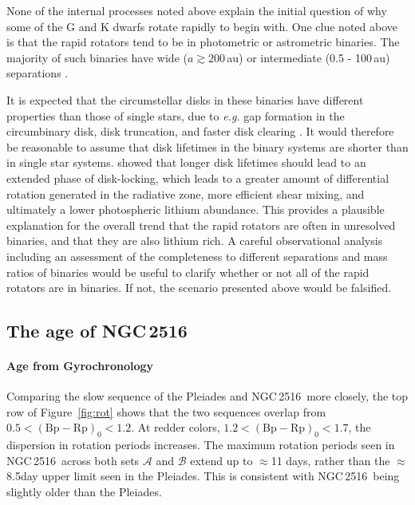 \documentclass[12pt,twocolumn,tighten]{aastex63}
\newcommand{\cn}{NGC\,2516} %
\newcommand{\bpmrp}{(\mathrm{Bp}-\mathrm{Rp})_0}
\begin{document}
None of the internal processes noted above explain the initial
question of why some of the G and K dwarfs rotate rapidly to begin
with.  One clue noted above is that the rapid rotators tend to be in
photometric or astrometric binaries.  The majority of such binaries
have wide ($a\gtrsim200$\,au) or intermediate (0.5 - 100\,au)
separations \citep{raghavan_survey_2010}.

It is expected that the circumstellar disks in these binaries have
different properties than those of single stars, due to {\it e.g.} gap
formation in the circumbinary disk, disk truncation, and faster disk
clearing \citep{artymowicz_dynamics_1994,moe_impact_2020}.  It would
therefore be reasonable to assume that disk lifetimes in the binary
systems are shorter than in single star systems.
\citet{eggenberger_impact_2012} showed that longer disk lifetimes
should lead to an extended phase of disk-locking, which leads to a
greater amount of differential rotation generated in the radiative
zone, more efficient shear mixing, and ultimately a lower photospheric
lithium abundance.  This provides a plausible explanation for the
overall trend that the rapid rotators are often in unresolved
binaries, and that they are also lithium rich.  A careful
observational analysis including an assessment of the completeness to
different separations and mass ratios of binaries would be useful to
clarify whether or not all of the rapid rotators are in binaries.  If
not, the scenario presented above would be falsified.


\subsection{The age of NGC\,2516}
\label{disc:absage}


\paragraph{Age from Gyrochronology}
Comparing the slow sequence of the Pleiades and \cn\ more closely, the
top row of Figure~\ref{fig:rot} shows that the two sequences overlap
from $0.5<\bpmrp<1.2$.  At redder colors, $1.2<\bpmrp<1.7$, the
dispersion in rotation periods increases.  The maximum rotation
periods seen in \cn\ across both sets $\mathcal{A}$ and $\mathcal{B}$
extend up to $\approx$11 days, rather than the $\approx$8.5day upper
limit seen in the Pleiades.  This is consistent with \cn\ being
slightly older than the Pleiades.
\end{document}
